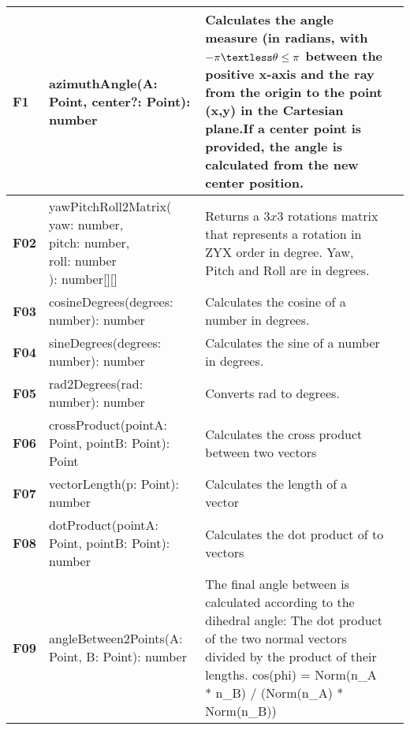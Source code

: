 \begin{xltabular}{\textwidth}{|M{1.2cm}|X|X|M{3cm}|}
\hline 
 \endlastfoot 
\textbf{ F1 } & {\ttfamily azimuthAngle(A: Point, center?: Point): number} & Calculates the angle measure (in radians, with $-\pi \textless \theta \le \pi$ between the positive x-axis and the ray from the origin to the point {\ttfamily(x,y)} in the Cartesian plane.\newline If a center point is provided, the angle is calculated from the new center position. &  \\ \hline 
  \textbf{F02} & {\ttfamily yawPitchRoll2Matrix( \newline yaw: number,\newline pitch: number,\newline roll: number\newline): number[][]} & Returns a $3x3$ rotations matrix that represents a rotation in ZYX order in degree. \newline Yaw, Pitch and Roll are in degrees. &  \\ \hline 
  \textbf{F03} & {\ttfamily cosineDegrees(degrees: number): number } & Calculates the cosine of a number in degrees. &  \\ \hline 
  \textbf{F04} & {\ttfamily sineDegrees(degrees: number): number} & Calculates the sine of a number in degrees. &  \\ \hline 
  \textbf{F05} & {\ttfamily rad2Degrees(rad: number): number} & Converts rad to degrees. &  \\ \hline 
  \textbf{F06} & {\ttfamily crossProduct(pointA: Point, pointB: Point): Point} & Calculates the cross product between two vectors &  \\ \hline 
  \textbf{F07} & {\ttfamily vectorLength(p: Point): number} & Calculates the length of a vector &  \\ \hline 
  \textbf{F08} & {\ttfamily dotProduct(pointA: Point, pointB: Point): number} & Calculates the dot product of to vectors &  \\ \hline 
  \textbf{F09} & {\ttfamily angleBetween2Points(A: Point, B: Point): number} & The final angle between is calculated according to the dihedral angle: The dot product of the two normal vectors divided by the product of their lengths. \newline cos(phi) = Norm(n_A * n_B) / (Norm(n_A) * Norm(n_B)) &  \\ \hline 

\end{xltabular}
